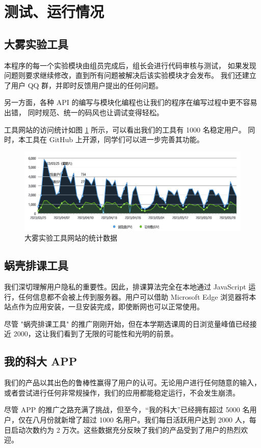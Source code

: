 \section{测试、运行情况}

\subsection{大雾实验工具}

本程序的每一个实验模块由组员完成后，组长会进行代码审核与测试，
如果发现问题则要求继续修改，直到所有问题被解决后该实验模块才会发布。
我们还建立了用户 QQ 群，并即时反馈用户提出的任何问题。

另一方面，各种 API 的编写与模块化编程也让我们的程序在编写过程中更不容易出错，
同时规范、统一的码风也让调试变得轻松。


工具网站的访问统计如图 \ref{fig:2} 所示，可以看出我们的工具有 1000 名稳定用户。
同时，本工具在 GitHub 上开源，同学们可以进一步完善其功能。

\begin{figure}[htbp]
  \centering
  \includegraphics[width=\columnwidth]{figure/2.png}
  \caption{大雾实验工具网站的统计数据}
  \label{fig:2}
\end{figure}

\subsection{蜗壳排课工具}

我们深切理解用户隐私的重要性。因此，排课算法完全在本地通过 JavaScript 运行，任何信息都不会被上传到服务器。用户可以借助 Microsoft Edge 浏览器将本站点作为应用安装，一旦安装完成，即使断网也可以正常使用。

尽管 "蜗壳排课工具" 的推广刚刚开始，但在本学期选课周的日浏览量峰值已经接近 2000，这让我们看到了无限的可能性和光明的前景。

\subsection{我的科大 APP}

我们的产品以其出色的鲁棒性赢得了用户的认可。无论用户进行任何随意的输入，或者尝试进行任何非常规操作，我们的应用都能稳定运行，不会发生崩溃。

尽管 APP 的推广之路充满了挑战，但至今，“我的科大”已经拥有超过 5000 名用户，仅在八月份就新增了超过 1000 名用户。我们每日活跃用户达到 2000 人，每日启动次数约为 2 万次。这些数据充分反映了我们的产品受到了用户的热烈欢迎。